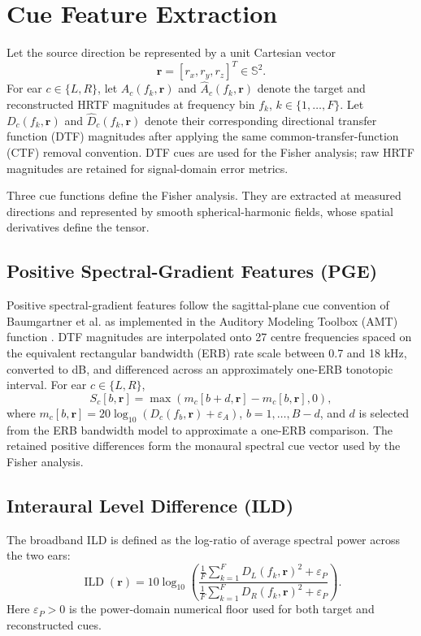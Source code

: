 \documentclass[journal]{IEEEtran}
\begin{document}
\section{Cue Feature Extraction}
Let the source direction be represented by a unit Cartesian vector
\[
\mathbf{r}=[r_x,r_y,r_z]^T\in\mathbb{S}^{2}.
\]
For ear \(c\in\{L,R\}\), let \(A_c(f_k,\mathbf{r})\) and \(\widehat{A}_c(f_k,\mathbf{r})\) denote the target and reconstructed HRTF magnitudes at frequency bin \(f_k\), \(k\in\{1,\ldots,F\}\). Let \(D_c(f_k,\mathbf{r})\) and \(\widehat{D}_c(f_k,\mathbf{r})\) denote their corresponding directional transfer function (DTF) magnitudes after applying the same common-transfer-function (CTF) removal convention. DTF cues are used for the Fisher analysis; raw HRTF magnitudes are retained for signal-domain error metrics.

Three cue functions define the Fisher analysis. They are extracted at measured directions and represented by smooth spherical-harmonic fields, whose spatial derivatives define the tensor.

\subsection{Positive Spectral-Gradient Features (PGE)}
Positive spectral-gradient features follow the sagittal-plane cue convention of Baumgartner et al. \cite{Baumgartner2014} as implemented in the Auditory Modeling Toolbox (AMT) function . DTF magnitudes are interpolated onto 27 centre frequencies spaced on the equivalent rectangular bandwidth (ERB) rate scale between 0.7 and 18 kHz, converted to dB, and differenced across an approximately one-ERB tonotopic interval. For ear \(c\in\{L,R\}\),
\begin{equation}
S_c[b,\mathbf{r}]
=\max\!\left(m_c[b+d,\mathbf{r}]-m_c[b,\mathbf{r}],0\right),
\end{equation}
where \(m_c[b,\mathbf r]=20\log_{10}(D_c(f_b,\mathbf r)+\varepsilon_A)\), \(b=1,\ldots,B-d\), and \(d\) is selected from the ERB bandwidth model to approximate a one-ERB comparison. The retained positive differences form the monaural spectral cue vector used by the Fisher analysis.
\subsection{Interaural Level Difference (ILD)}
The broadband ILD is defined as the log-ratio of average spectral power across the two ears:
\begin{equation}
\operatorname{ILD}(\mathbf{r})
= 10\log_{10}\!\left(
\frac{\frac{1}{F}\sum_{k=1}^{F} D_L(f_k,\mathbf{r})^2 + \varepsilon_P}
     {\frac{1}{F}\sum_{k=1}^{F} D_R(f_k,\mathbf{r})^2 + \varepsilon_P}
\right).
\end{equation}
Here \(\varepsilon_P>0\) is the power-domain numerical floor used for both target and reconstructed cues.
\end{document}
